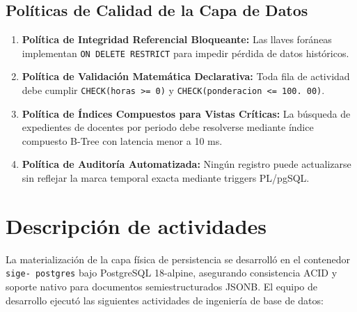 \documentclass[12pt,a4paper]{article}
\begin{document}
\subsection{Políticas de Calidad de la Capa de Datos}
\begin{enumerate}[leftmargin=1.5em, itemsep=2pt]
    \item \textbf{Política de Integridad Referencial Bloqueante:} Las llaves foráneas implementan \texttt{ON DELETE RESTRICT} para impedir pérdida de datos históricos.
    \item \textbf{Política de Validación Matemática Declarativa:} Toda fila de actividad debe cumplir \texttt{CHECK(horas >= 0)} y \texttt{CHECK(ponderacion <= 100. 00)}.
    \item \textbf{Política de Índices Compuestos para Vistas Críticas:} La búsqueda de expedientes de docentes por periodo debe resolverse mediante índice compuesto B-Tree con latencia menor a 10 ms.
    \item \textbf{Política de Auditoría Automatizada:} Ningún registro puede actualizarse sin reflejar la marca temporal exacta mediante triggers PL/pgSQL.
\end{enumerate}

\section{Descripción de actividades}
La materialización de la capa física de persistencia se desarrolló en el contenedor \texttt{sige- postgres} bajo PostgreSQL 18-alpine, asegurando consistencia ACID y soporte nativo para documentos semiestructurados JSONB. El equipo de desarrollo ejecutó las siguientes actividades de ingeniería de base de datos:
\end{document}
